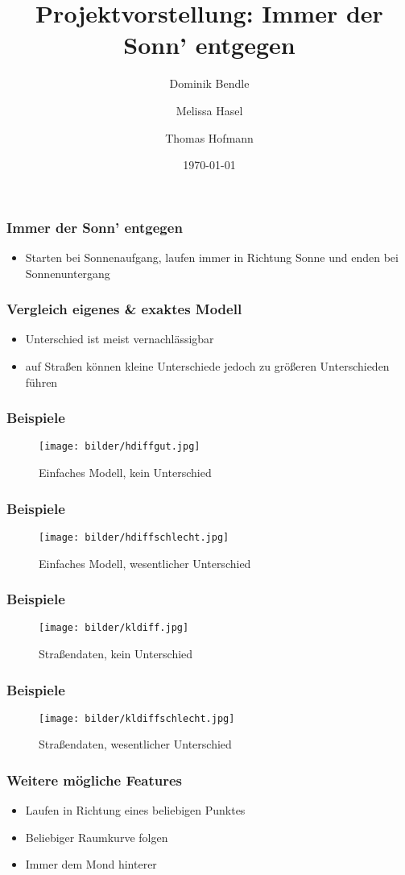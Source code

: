 \documentclass[aspectratio=43]{beamer}
\title{Projektvorstellung: Immer der Sonn' entgegen}
\author{Dominik Bendle \and Melissa Hasel \and Thomas Hofmann}
\date{\today}
\institute{TU Kaiserslautern}
\begin{document}
\begin{frame}[plain]


\end{frame}

\begin{frame}
    \frametitle{Immer der Sonn' entgegen}
    \begin{itemize}
        \item Starten bei Sonnenaufgang, laufen immer in Richtung Sonne und enden bei
            Sonnenuntergang
    \end{itemize}
\end{frame}

\begin{frame}
    \frametitle{Vergleich eigenes \& exaktes Modell}
    \begin{itemize}
        \item Unterschied ist meist vernachlässigbar
        \item auf Straßen können kleine Unterschiede jedoch zu größeren Unterschieden
            führen
    \end{itemize}
\end{frame}

\begin{frame}
    \frametitle{Beispiele}
    \begin{figure}[t]
        \centering
        \texttt{[image: bilder/hdiffgut.jpg]}
        \caption{Einfaches Modell, kein Unterschied}
    \end{figure}
\end{frame}

\begin{frame}
    \frametitle{Beispiele}
    \begin{figure}[t]
        \centering
        \texttt{[image: bilder/hdiffschlecht.jpg]}
        \caption{Einfaches Modell, wesentlicher Unterschied}
    \end{figure}
\end{frame}

\begin{frame}
    \frametitle{Beispiele}
    \begin{figure}[t]
        \centering
        \texttt{[image: bilder/kldiff.jpg]}
        \caption{Straßendaten, kein Unterschied}
    \end{figure}
\end{frame}

\begin{frame}
    \frametitle{Beispiele}
    \begin{figure}[t]
        \centering
        \texttt{[image: bilder/kldiffschlecht.jpg]}
        \caption{Straßendaten, wesentlicher Unterschied}
    \end{figure}
\end{frame}

\begin{frame}
    \frametitle{Weitere mögliche Features}
    \begin{itemize}
        \item Laufen in Richtung eines beliebigen Punktes
        \item Beliebiger Raumkurve folgen
        \item Immer dem Mond hinterer 
    \end{itemize}
\end{frame}
\end{document}
